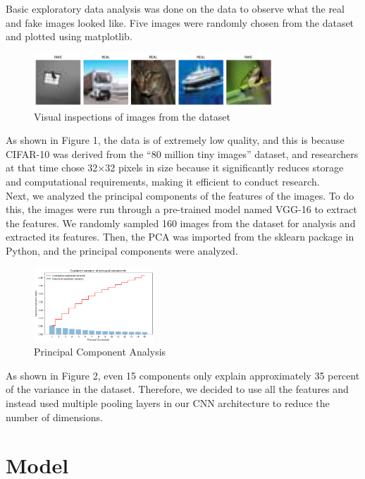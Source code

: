 \documentclass[11pt]{article}
\begin{document}
Basic exploratory data analysis was done on the data to observe what the real and fake images looked like. Five images were randomly chosen from the dataset and plotted using matplotlib.
\begin{figure}[htbp]
    \centering
    \includegraphics[width=0.8\textwidth]{EDA.png} 
    \caption{Visual inspections of images from the dataset}
    \label{fig:eda}
\end{figure}
As shown in Figure 1, the data is of extremely low quality, and this is because CIFAR-10 was derived from the “80 million tiny images” dataset, and researchers at that time chose 32×32 pixels in size because it significantly reduces storage and computational requirements, making it efficient to conduct research. \\Next, we analyzed the principal components of the features of the images. To do this, the images were run through a pre-trained model named VGG-16 to extract the features. We randomly sampled 160 images from the dataset for analysis and extracted its features. Then, the PCA was imported from the sklearn package in Python, and the principal components were analyzed. 
\begin{figure}[htbp]
    \centering
    \includegraphics[width=0.4\textwidth]{PCA.png} 
    \caption{Principal Component Analysis}
    \label{fig:pca}
\end{figure}
As shown in Figure 2, even 15 components only explain approximately 35 percent of the variance in the dataset. Therefore, we decided to use all the features and instead used multiple pooling layers in our CNN architecture to reduce the number of dimensions. 

\section{Model}

\blindtext %
\end{document}

